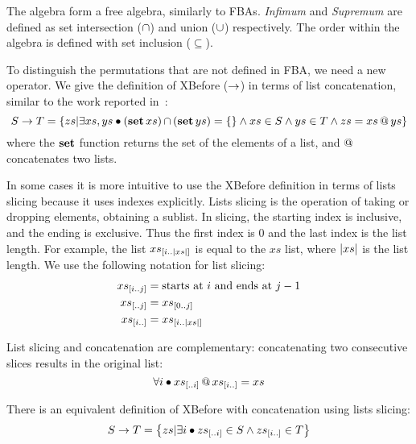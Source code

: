 \documentclass[12pt,openright,twoside,a4paper,oldfontcommands,english,brazil,final]{abntex2}
\makeatletter
\theoremstyle{theo}
\newcommand{\sliceright}[2]{\ensuremath #1_{\left[..#2\right]}}
\newcommand{\sliceleft}[2]{\ensuremath #1_{\left[#2..\right]}}
\newcommand{\slice}[3]{\ensuremath #1_{\left[#2..#3\right]}}
\def\xbeforeop{\ensuremath\rightarrow}
\newcommand{\xbefore}[2]{\ensuremath #1 \xbeforeop #2 }
\newcommand{\length}[1]{\ensuremath\left|#1\right|}
\newcommand{\append}[2]{\ensuremath #1 \operatorname{\mathbf{@}} #2}
\def\listsetop{\ensuremath\operatorname{\mathbf{set}}}
\newcommand{\listset}[1]{\ensuremath\listsetop #1}
\newcommand{\setsin}[1]{\ensuremath\left\{ #1 \right\}}
\newcommand{\parsin}[1]{\ensuremath\left( #1 \right)}
\def\union{\ensuremath\operatorname{\cup}}
\def\inter{\ensuremath\operatorname{\cap}}
\makeatother
\begin{document}
The \ac{algebra} form a free algebra, similarly to \acp{FBA}.
\emph{Infimum} and \emph{Supremum} are defined as set intersection ($\inter$) and union ($\union$) respectively.
The order within the algebra is defined with set inclusion ($\subseteq$).

To distinguish the permutations that are not defined in \ac{FBA}, we need a new operator.
We give the definition of \ac{XBefore} ($\xbeforeop$) in terms of list concatenation, similar to the work reported in~\cite{DM2015}:
%
\begin{equation}
\label{def:xbefore-append}
\xbefore{S}{T} =
  \setsin{
    zs | \exists xs, ys \bullet \parsin{\listset{xs}} \inter \parsin{\listset{ys}} = \{\}
      \land xs \in S \land ys \in T \land zs = \append{xs}{ys}
  }
\end{equation}
%
where the $\listset{}$ function returns the set of the elements of a list, and $\append{}{}$ concatenates two lists.

In some cases it is more intuitive to use the \ac{XBefore} definition in terms of lists slicing because it uses indexes explicitly.
Lists slicing is the operation of taking or dropping elements, obtaining a sublist.
In slicing, the starting index is inclusive, and the ending is exclusive.
Thus the first index is 0 and the last index is the list length.
For example, the list $\slice{xs}{i}{\length{xs}}$ is equal to the $xs$ list, where $\length{xs}$ is the list length.
We use the following notation for list slicing:
%
\begin{subequations}
\begin{align}
\slice{xs}{i}{j} &= \text{starts at $i$ and ends at $j-1$}\label{def:slice}\\
\sliceright{xs}{j} &= \slice{xs}{0}{j}\label{def:slice-right}\\
\sliceleft{xs}{i} &= \slice{xs}{i}{\length{xs}}\label{def:slice-left}
\end{align}
\end{subequations}

List slicing and concatenation are complementary: concatenating two consecutive slices results in the original list:
\begin{equation}
\label{law:slice-append}
\forall i \bullet \append{\sliceright{xs}{i}}{\sliceleft{xs}{i}} = xs
\end{equation}

There is an equivalent definition of \ac{XBefore} with concatenation using lists slicing:
%
\begin{equation}
\label{def:xbefore-slice}
\xbefore{S}{T} =
  \setsin{
    zs | \exists i \bullet \sliceright{zs}{i} \in S \land \sliceleft{zs}{i} \in T
  }
\end{equation}
\end{document}
